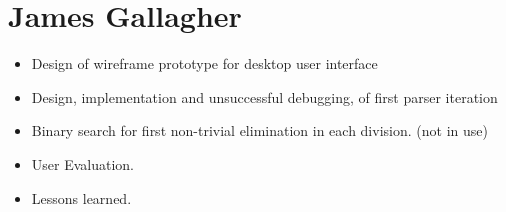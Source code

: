 \section{James Gallagher}

\begin{itemize}
\item Design of wireframe prototype for desktop user interface
\item Design, implementation and unsuccessful debugging, of first parser iteration
\item Binary search for first non-trivial elimination in each division. (not in use)
\item User Evaluation. 
\item Lessons learned. 
 
\end{itemize}
